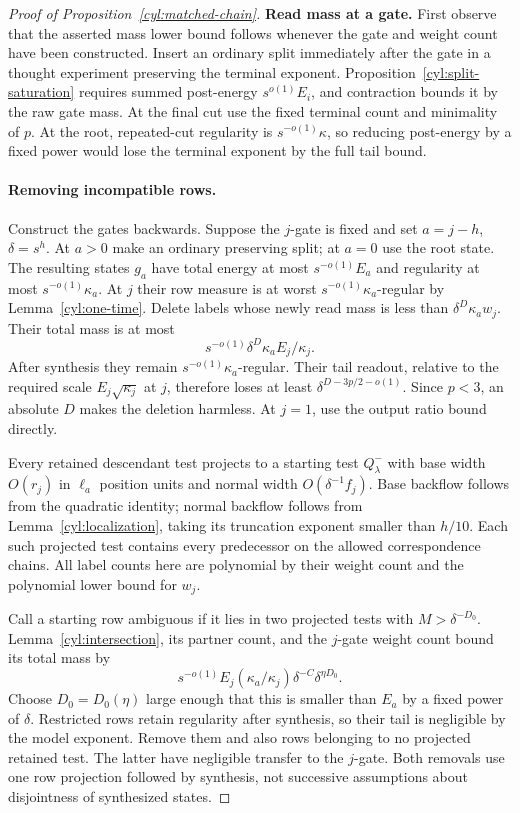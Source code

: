 \begin{proof}[Proof of Proposition~\ref{cyl:matched-chain}]
\textbf{Read mass at a gate.}
First observe that the asserted mass lower bound follows whenever the
gate and weight count have been constructed.  Insert an ordinary split
immediately after the gate in a thought experiment preserving the
terminal exponent.  Proposition~\ref{cyl:split-saturation} requires
summed post-energy $s^{o(1)}E_i$, and contraction bounds it by the raw
gate mass.  At the final cut use the fixed terminal count and minimality
of $p$.  At the root, repeated-cut regularity is $s^{-o(1)}\kappa$,
so reducing post-energy by a fixed power would lose the terminal exponent
by the full tail bound.

\paragraph{Removing incompatible rows.}
Construct the gates backwards.  Suppose the $j$-gate is fixed and set
$a=j-h$, $\delta=s^h$.  At $a>0$ make an ordinary preserving split;
at $a=0$ use the root state.  The resulting states $g_a$ have total
energy at most $s^{-o(1)}E_a$ and regularity at most
$s^{-o(1)}\kappa_a$.  At $j$ their row measure is at worst
$s^{-o(1)}\kappa_a$-regular by Lemma~\ref{cyl:one-time}.
Delete labels whose newly read mass is less than
$\delta^D\kappa_aw_j$.  Their total mass is at most
\[
 s^{-o(1)}\delta^D\kappa_a E_j/\kappa_j.
\]
After synthesis they remain $s^{-o(1)}\kappa_a$-regular.  Their tail
readout, relative to the required scale $E_j\sqrt{\kappa_j}$ at $j$,
therefore loses at least $\delta^{D-3p/2-o(1)}$.  Since $p<3$, an
absolute $D$ makes the deletion harmless.  At $j=1$, use the output
ratio bound directly.

Every retained descendant test projects to a starting test $Q^-_\lambda$
with base width $O(r_j)$ in $\ell_a$ position units and normal width
$O(\delta^{-1}f_j)$.  Base backflow follows from the quadratic identity;
normal backflow follows from Lemma~\ref{cyl:localization}, taking its
truncation exponent smaller than $h/10$.  Each such projected test
contains every predecessor on the allowed correspondence chains.
All label counts here are polynomial by their weight count and the
polynomial lower bound for $w_j$.

Call a starting row ambiguous if it lies in two projected tests with
$M>\delta^{-D_0}$.  Lemma~\ref{cyl:intersection}, its partner count,
and the $j$-gate weight count bound its total mass by
\[
 s^{-o(1)}E_j(\kappa_a/\kappa_j)
                  \delta^{-C}\delta^{\eta D_0}.
\]
Choose $D_0=D_0(\eta)$ large enough that this is smaller than $E_a$ by
a fixed power of $\delta$.  Restricted rows retain regularity after
synthesis, so their tail is negligible by the model exponent.  Remove
them and also rows belonging to no projected retained test.  The latter
have negligible transfer to the $j$-gate.  Both removals use one row
projection followed by synthesis, not successive assumptions about
disjointness of synthesized states.


\end{proof}
